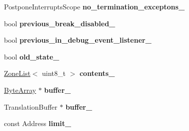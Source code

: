 \begin{DoxyCompactItemize}
\item 
Postpone\+Interrupts\+Scope {\bfseries no\+\_\+termination\+\_\+exceptons\+\_\+}\hypertarget{classv8_1_1internal_1_1_b_a_s_e___e_m_b_e_d_d_e_d_a80cac219baa774cc9520fb4e9f0d434c}{}\label{classv8_1_1internal_1_1_b_a_s_e___e_m_b_e_d_d_e_d_a80cac219baa774cc9520fb4e9f0d434c}

\item 
bool {\bfseries previous\+\_\+break\+\_\+disabled\+\_\+}\hypertarget{classv8_1_1internal_1_1_b_a_s_e___e_m_b_e_d_d_e_d_ae5beb30f38de8fc553be2a270b0880bb}{}\label{classv8_1_1internal_1_1_b_a_s_e___e_m_b_e_d_d_e_d_ae5beb30f38de8fc553be2a270b0880bb}

\item 
bool {\bfseries previous\+\_\+in\+\_\+debug\+\_\+event\+\_\+listener\+\_\+}\hypertarget{classv8_1_1internal_1_1_b_a_s_e___e_m_b_e_d_d_e_d_acc72e6b47c37489768d7669f2db341a3}{}\label{classv8_1_1internal_1_1_b_a_s_e___e_m_b_e_d_d_e_d_acc72e6b47c37489768d7669f2db341a3}

\item 
bool {\bfseries old\+\_\+state\+\_\+}\hypertarget{classv8_1_1internal_1_1_b_a_s_e___e_m_b_e_d_d_e_d_a81fec0f88f4b840fd7c3815656a8b95b}{}\label{classv8_1_1internal_1_1_b_a_s_e___e_m_b_e_d_d_e_d_a81fec0f88f4b840fd7c3815656a8b95b}

\item 
\hyperlink{classv8_1_1internal_1_1_zone_list}{Zone\+List}$<$ uint8\+\_\+t $>$ {\bfseries contents\+\_\+}\hypertarget{classv8_1_1internal_1_1_b_a_s_e___e_m_b_e_d_d_e_d_adeea9d2321d1be02ebb4c3db316db8bf}{}\label{classv8_1_1internal_1_1_b_a_s_e___e_m_b_e_d_d_e_d_adeea9d2321d1be02ebb4c3db316db8bf}

\item 
\hyperlink{classv8_1_1internal_1_1_byte_array}{Byte\+Array} $\ast$ {\bfseries buffer\+\_\+}\hypertarget{classv8_1_1internal_1_1_b_a_s_e___e_m_b_e_d_d_e_d_a8211e82f77e23c2e6e159a385294b5cd}{}\label{classv8_1_1internal_1_1_b_a_s_e___e_m_b_e_d_d_e_d_a8211e82f77e23c2e6e159a385294b5cd}

\item 
Translation\+Buffer $\ast$ {\bfseries buffer\+\_\+}\hypertarget{classv8_1_1internal_1_1_b_a_s_e___e_m_b_e_d_d_e_d_aeba6152505693a65b33ac69d6643a551}{}\label{classv8_1_1internal_1_1_b_a_s_e___e_m_b_e_d_d_e_d_aeba6152505693a65b33ac69d6643a551}

\item 
const Address {\bfseries limit\+\_\+}\hypertarget{classv8_1_1internal_1_1_b_a_s_e___e_m_b_e_d_d_e_d_ab254ebd092e6e97bddfbbdaf2fddf36c}{}\label{classv8_1_1internal_1_1_b_a_s_e___e_m_b_e_d_d_e_d_ab254ebd092e6e97bddfbbdaf2fddf36c}


\end{DoxyCompactItemize}
